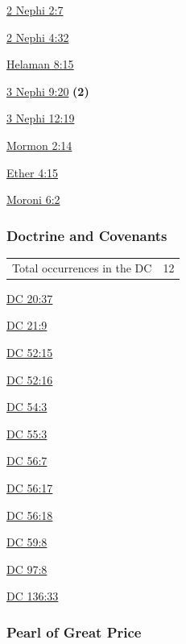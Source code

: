 		\begin{compactdesc}
			\item[{\hyperref[2NEPHI-2-7]{2 Nephi 2:7}}]
			\item[{\hyperref[2NEPHI-4-32]{2 Nephi 4:32}}]
			\item[{\hyperref[HELAMAN-8-15]{Helaman 8:15}}]
			\item[{\hyperref[3NEPHI-9-20]{3 Nephi 9:20}}] \textbf{(2)}
			\item[{\hyperref[3NEPHI-12-19]{3 Nephi 12:19}}]
			\item[{\hyperref[MORMON-2-14]{Mormon 2:14}}]
			\item[{\hyperref[ETHER-4-15]{Ether 4:15}}]
			\item[{\hyperref[MORONI-6-2]{Moroni 6:2}}]
		\end{compactdesc}
		
	\subsubsection{Doctrine and Covenants} %
		\label{CONTRITE-DC}
	
		\begin{tabular}{ll}
			Total occurrences in the DC & 12
		\end{tabular}
		
		\begin{compactdesc}
			\item[{\hyperref[DC20-37]{DC 20:37}}]
			\item[{\hyperref[DC21-9]{DC 21:9}}]
			\item[{\hyperref[DC52-15]{DC 52:15}}]
			\item[{\hyperref[DC52-16]{DC 52:16}}]
			\item[{\hyperref[DC54-3]{DC 54:3}}]
			\item[{\hyperref[DC55-3]{DC 55:3}}]
			\item[{\hyperref[DC56-7]{DC 56:7}}]
			\item[{\hyperref[DC56-17]{DC 56:17}}]
			\item[{\hyperref[DC56-18]{DC 56:18}}]
			\item[{\hyperref[DC59-8]{DC 59:8}}]
			\item[{\hyperref[DC97-8]{DC 97:8}}]
			\item[{\hyperref[DC136-33]{DC 136:33}}]
		\end{compactdesc}
		
	\subsubsection{Pearl of Great Price} %
		\label{CONTRITE-PGP}
	

